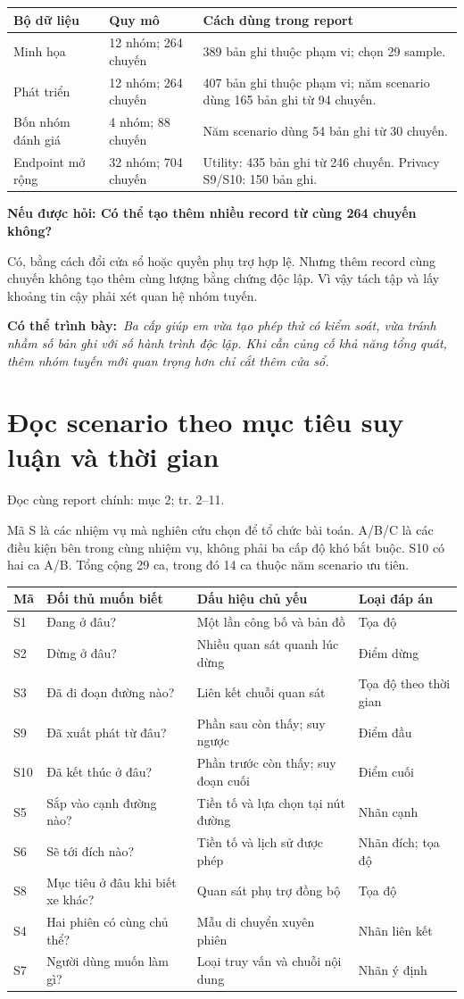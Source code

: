 \documentclass[10pt,a4paper]{article}
\newcommand{\say}[1]{\par\textbf{Có thể trình bày:}\ \textit{#1}\par}
\newcommand{\ask}[2]{\par\textbf{Nếu được hỏi: #1}\par #2\par}
\newcommand{\where}[1]{\par{\small\color{gray}Đọc cùng report chính: #1.}\par}
\newcommand{\guidepage}[1]{\clearpage\section{#1}}
\begin{document}
\begin{longtable}{@{}P{4.0cm}P{4.1cm}P{8.1cm}@{}}
\toprule Bộ dữ liệu & Quy mô & Cách dùng trong report\\\midrule
Minh họa & 12 nhóm; 264 chuyến & 389 bản ghi thuộc phạm vi; chọn 29 sample.\\[3pt]
Phát triển & 12 nhóm; 264 chuyến & 407 bản ghi thuộc phạm vi; năm scenario dùng 165 bản ghi từ 94 chuyến.\\[3pt]
Bốn nhóm đánh giá & 4 nhóm; 88 chuyến & Năm scenario dùng 54 bản ghi từ 30 chuyến.\\[3pt]
Endpoint mở rộng & 32 nhóm; 704 chuyến & Utility: 435 bản ghi từ 246 chuyến. Privacy S9/S10: 150 bản ghi.\\
\bottomrule
\end{longtable}

\ask{Có thể tạo thêm nhiều record từ cùng 264 chuyến không?}{Có, bằng cách đổi cửa sổ hoặc quyền phụ trợ hợp lệ. Nhưng thêm record cùng chuyến không tạo thêm cùng lượng bằng chứng độc lập. Vì vậy tách tập và lấy khoảng tin cậy phải xét quan hệ nhóm tuyến.}
\say{Ba cấp giúp em vừa tạo phép thử có kiểm soát, vừa tránh nhầm số bản ghi với số hành trình độc lập. Khi cần củng cố khả năng tổng quát, thêm nhóm tuyến mới quan trọng hơn chỉ cắt thêm cửa sổ.}

\guidepage{Đọc scenario theo mục tiêu suy luận và thời gian}
\where{mục 2; tr. 2--11}
Mã S là các nhiệm vụ mà nghiên cứu chọn để tổ chức bài toán. A/B/C là các điều kiện bên trong cùng nhiệm vụ, không phải ba cấp độ khó bắt buộc. S10 có hai ca A/B. Tổng cộng 29 ca, trong đó 14 ca thuộc năm scenario ưu tiên.

\begin{longtable}{@{}P{1.3cm}P{4.7cm}P{6.0cm}P{4.0cm}@{}}
\toprule Mã & Đối thủ muốn biết & Dấu hiệu chủ yếu & Loại đáp án\\\midrule
S1 & Đang ở đâu? & Một lần công bố và bản đồ & Tọa độ\\[3pt]
S2 & Dừng ở đâu? & Nhiều quan sát quanh lúc dừng & Điểm dừng\\[3pt]
S3 & Đã đi đoạn đường nào? & Liên kết chuỗi quan sát & Tọa độ theo thời gian\\[3pt]
S9 & Đã xuất phát từ đâu? & Phần sau còn thấy; suy ngược & Điểm đầu\\[3pt]
S10 & Đã kết thúc ở đâu? & Phần trước còn thấy; suy đoạn cuối & Điểm cuối\\[3pt]
S5 & Sắp vào cạnh đường nào? & Tiền tố và lựa chọn tại nút đường & Nhãn cạnh\\[3pt]
S6 & Sẽ tới đích nào? & Tiền tố và lịch sử được phép & Nhãn đích; tọa độ\\[3pt]
S8 & Mục tiêu ở đâu khi biết xe khác? & Quan sát phụ trợ đồng bộ & Tọa độ\\[3pt]
S4 & Hai phiên có cùng chủ thể? & Mẫu di chuyển xuyên phiên & Nhãn liên kết\\[3pt]
S7 & Người dùng muốn làm gì? & Loại truy vấn và chuỗi nội dung & Nhãn ý định\\
\bottomrule
\end{longtable}
\end{document}
